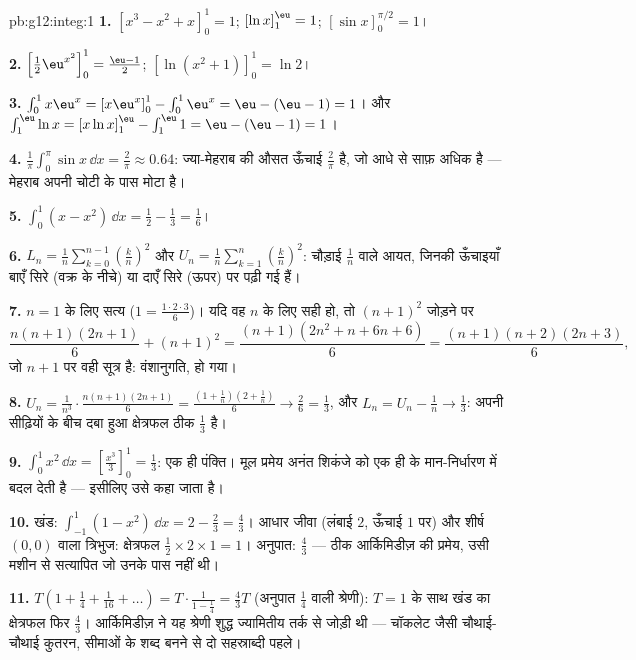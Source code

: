 \begin{solution}{pb:g12:integ:1}
\textbf{1.} $\left[x^3 - x^2 + x\right]_0^1 = 1$; \quad $\left[\ln x\right]_1^{\eu} = 1$; \quad $\left[\sin x\right]_0^{\pi/2} = 1$।

\textbf{2.} $\left[\frac12 \eu^{x^2}\right]_0^1 =
\frac{\eu - 1}{2}$; \quad $\left[\ln(x^2 + 1)\right]_0^1 = \ln 2$।

\textbf{3.} $\int_0^1 x\eu^x = \left[x\eu^x\right]_0^1 -
\int_0^1 \eu^x = \eu - (\eu - 1) = 1$। और $\int_1^{\eu} \ln x = \left[x\ln x\right]_1^{\eu} -
\int_1^{\eu} 1 = \eu - (\eu - 1) = 1$।

\textbf{4.} $\frac{1}{\pi}\int_0^\pi \sin x\,\dd x =
\frac{2}{\pi} \approx 0.64$: ज्या-मेहराब की औसत ऊँचाई $\frac2\pi$ है, जो आधे से साफ़ अधिक है ---
मेहराब अपनी चोटी के पास मोटा है।

\textbf{5.} $\int_0^1 (x - x^2)\,\dd x = \frac12 - \frac13 =
\frac16$।

\textbf{6.} $L_n = \frac1n \sum_{k=0}^{n-1}
\left(\frac kn\right)^2$ और $U_n = \frac1n \sum_{k=1}^{n} \left(\frac kn\right)^2$: चौड़ाई $\frac1n$ वाले आयत, जिनकी ऊँचाइयाँ बाएँ सिरे
(वक्र के नीचे) या दाएँ सिरे (ऊपर) पर पढ़ी गई हैं।

\textbf{7.} $n = 1$ के लिए सत्य ($1 = \frac{1 \cdot 2 \cdot
3}{6}$)। यदि वह $n$ के लिए सही हो, तो $(n+1)^2$
जोड़ने पर
\[
\frac{n(n+1)(2n+1)}{6} + (n+1)^2
= \frac{(n+1)\left(2n^2 + n + 6n + 6\right)}{6}
= \frac{(n+1)(n+2)(2n+3)}{6},
\]
जो $n + 1$ पर वही सूत्र है: वंशानुगति, हो गया।

\textbf{8.} $U_n = \frac{1}{n^3} \cdot
\frac{n(n+1)(2n+1)}{6} = \frac{(1 + \frac1n)(2 + \frac1n)}{6}
\to \frac26 = \frac13$, और $L_n = U_n - \frac1n \to \frac13$: अपनी सीढ़ियों के बीच दबा हुआ क्षेत्रफल ठीक $\frac13$
है।

\textbf{9.} $\int_0^1 x^2\,\dd x =
\left[\frac{x^3}{3}\right]_0^1 = \frac13$: एक ही पंक्ति। मूल प्रमेय अनंत शिकंजे को एक ही 
के मान-निर्धारण में बदल देती है --- इसीलिए उसे  कहा जाता है।

\textbf{10.} खंड: $\int_{-1}^{1}(1 - x^2)\,\dd x =
2 - \frac23 = \frac43$। आधार जीवा (लंबाई $2$, ऊँचाई $1$ पर) और शीर्ष
$(0,0)$ वाला त्रिभुज: क्षेत्रफल $\frac12 \times 2 \times 1 = 1$। अनुपात: $\frac43$ --- ठीक आर्किमिडीज़ की
प्रमेय, उसी मशीन से सत्यापित जो उनके पास नहीं थी।

\textbf{11.} $T\left(1 + \frac14 + \frac{1}{16} + \dots\right)
= T \cdot \frac{1}{1 - \frac14} = \frac43 T$ (अनुपात $\frac14$ वाली  श्रेणी): $T = 1$ के साथ खंड का
क्षेत्रफल फिर $\frac43$। आर्किमिडीज़ ने यह श्रेणी शुद्ध ज्यामितीय तर्क से जोड़ी
थी --- चॉकलेट जैसी चौथाई-चौथाई कुतरन, सीमाओं के शब्द बनने से दो सहस्राब्दी
पहले।


\end{solution}
